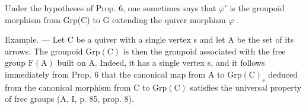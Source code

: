 Under the hypotheses of Prop. 6, one sometimes says that \(\varphi'\) is the groupoid morphism from Grp(C) to G extending the quiver morphism \(\varphi\) .

Example. --- Let C be a quiver with a single vertex s and let A be the set of its arrows. The groupoid \(\mathrm{Grp}(\mathrm{C})\) is then the groupoid associated with the free group \(\mathrm{F}(\mathrm{A})\) built on A. Indeed, it has a single vertex s, and it follows immediately from Prop. 6 that the canonical map from A to \(\mathrm{Grp}(\mathrm{C})_{s}\) deduced from the canonical morphism from C to \(\mathrm{Grp}(\mathrm{C})\) satisfies the universal property of free groups (A, I, p. 85, prop. 8).

